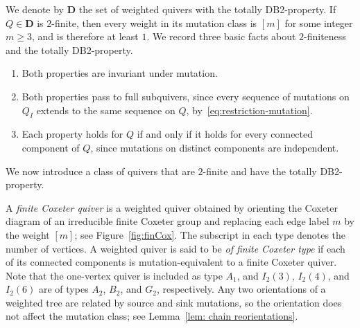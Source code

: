 \documentclass[11pt,reqno]{amsart}
\numberwithin{equation}{section}
\theoremstyle{definition}
\theoremstyle{plain}
\newcommand{\D}{\mathbf{D}}
\newcommand{\bra}[1]{\left[#1\right]}
\begin{document}
	We denote by $\D$ the set of weighted quivers with the totally DB2-property. If $Q\in\D$ is $2$-finite, then every weight in its mutation class is $\bra{m}$ for some integer $m\geq3$, and is therefore at least $1$. We record three basic facts about $2$-finiteness and the totally DB2-property.
	\begin{enumerate}
		\item Both properties are invariant under mutation.
		\item Both properties pass to full subquivers, since every sequence of mutations on $Q_I$ extends to the same sequence on $Q$, by~\eqref{eq:restriction-mutation}.
		\item Each property holds for $Q$ if and only if it holds for every connected component of $Q$, since mutations on distinct components are independent.
	\end{enumerate}
	
	We now introduce a class of quivers that are $2$-finite and have the totally DB2-property.
	
	A \emph{finite Coxeter quiver} is a weighted quiver obtained by orienting the Coxeter diagram of an irreducible finite Coxeter group and replacing each edge label $m$ by the weight $\bra{m}$; see Figure~\ref{fig:finCox}. The subscript in each type denotes the number of vertices. A weighted quiver is said to be \emph{of finite Coxeter type} if each of its connected components is mutation-equivalent to a finite Coxeter quiver. Note that the one-vertex quiver is included as type $A_1$, and $I_2(3)$, $I_2(4)$, and $I_2(6)$ are of types $A_2$, $B_2$, and $G_2$, respectively. Any two orientations of a weighted tree are related by source and sink mutations, so the orientation does not affect the mutation class; see Lemma~\ref{lem: chain reorientations}.
	
\end{document}
